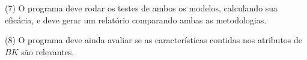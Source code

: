 (7) O programa deve rodar os testes de ambos os modelos, calculando sua eficácia, e deve gerar um relatório comparando ambas as metodologias.

(8) O programa deve ainda avaliar se as características contidas nos atributos de $BK$ são relevantes.



